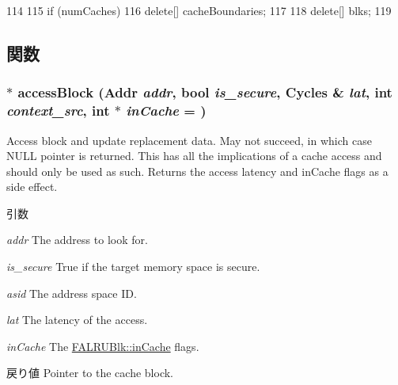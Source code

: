 \begin{DoxyCode}
114 {
115     if (numCaches)
116         delete[] cacheBoundaries;
117 
118     delete[] blks;
119 }
\end{DoxyCode}


\subsection{関数}
\hypertarget{classFALRU_a1cdfe87d1268e092f50485fd168e30ba}{
\subsubsection[{accessBlock}]{ $\ast$ accessBlock ({\bf Addr} {\em addr}, \/  bool {\em is\_\-secure}, \/  {\bf Cycles} \& {\em lat}, \/  int {\em context\_\-src}, \/  int $\ast$ {\em inCache} = {})}}
\label{classFALRU_a1cdfe87d1268e092f50485fd168e30ba}
Access block and update replacement data. May not succeed, in which case NULL pointer is returned. This has all the implications of a cache access and should only be used as such. Returns the access latency and inCache flags as a side effect. 
\begin{DoxyParams}{引数}
\item[{\em addr}]The address to look for. \item[{\em is\_\-secure}]True if the target memory space is secure. \item[{\em asid}]The address space ID. \item[{\em lat}]The latency of the access. \item[{\em inCache}]The \hyperlink{classFALRUBlk_ac6da16cc60d372d1160776a7dbd19225}{FALRUBlk::inCache} flags. \end{DoxyParams}
\begin{DoxyReturn}{戻り値}
Pointer to the cache block. 
\end{DoxyReturn}



